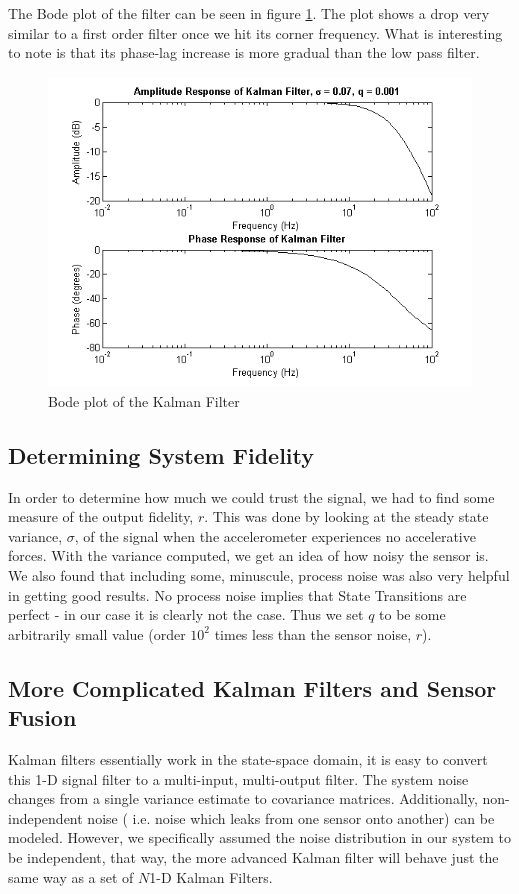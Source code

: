 \documentclass{article}
\theoremstyle{plain}
\theoremstyle{definition}
\theoremstyle{remark}
\begin{document}
The Bode plot of the filter can be seen in figure \ref{bode_KF}. The plot shows a drop very similar to a first order filter once we hit its corner frequency. What is interesting to note is that its phase-lag increase is more gradual than the low pass filter. 


\begin{figure}[hbt]
\begin{center}
\includegraphics[width = 12cm]{bode_KF}
\caption{Bode plot of the Kalman Filter}
\label{bode_KF}
\end{center}
\end{figure}

\subsection*{Determining System Fidelity}
In order to determine how much we could trust the signal, we had to find some measure of the output fidelity, $r$. This was done by looking at the steady state variance, $\sigma$, of the signal when the accelerometer experiences no accelerative forces. With the variance computed, we get an idea of how noisy the sensor is.\\

We also found that including some, minuscule, process noise was also very helpful in getting good results. No process noise implies that State Transitions are perfect - in our case it is clearly not the case. Thus we set $q$ to be some arbitrarily small value (order $10^2$ times less than the sensor noise, $r$).

\subsection*{More Complicated Kalman Filters and Sensor Fusion}
Kalman filters essentially work in the state-space domain, it is easy to convert this 1-D signal filter to a multi-input, multi-output filter. The system noise changes from a single variance estimate to covariance matrices. Additionally, non-independent noise ( i.e. noise which leaks from one sensor onto another) can be modeled. However, we specifically assumed the noise distribution in our system to be independent, that way, the more advanced Kalman filter will behave just the same way as a set of $N$1-D Kalman Filters.\\
\end{document}
